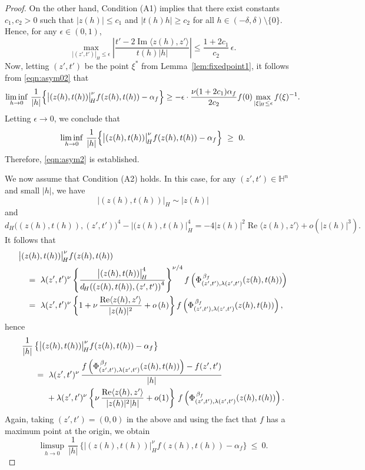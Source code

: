 \documentclass[10pt,a4paper]{amsart}
\begin{document}
\begin{proof}
On the other hand, Condition (A1) implies that there exist constants $c_1, c_2 > 0$ such that $|z(h)| \leq c_1$ and $|t(h) h| \geq c_2$ for all $h \in (-\delta, \delta) \setminus \{0\}$. Hence, for any $\epsilon \in (0, 1)$,
\[
\max_{|(z', t')|_{\! H} \leq \epsilon} \left| \frac{t' - 2 \operatorname{Im} \langle z(h), z' \rangle}{t(h) |h|} \right|
\leq \frac{1 + 2c_1}{c_2} \, \epsilon.
\]
Now, letting $(z', t')$ be the point $\xi^*$ from Lemma~\ref{lem:fixedpoint1}, it follows from \eqref{eqn:asym02} that
\begin{equation*}
\liminf_{h \to 0} \, \frac{1}{|h|} \Bigl\{ \bigl|(z(h),t(h)) \bigr|_{\! H}^{\nu} f(z(h), t(h)) - \alpha_f \Bigr\}
\geq - \epsilon \cdot \frac{\nu (1 + 2c_1) \alpha_f}{2 c_2} f(0) \max_{|\xi|_{\! H} \leq \epsilon} f(\xi)^{-1}.
\end{equation*}
Letting $\epsilon \to 0$, we conclude that
\begin{equation}
\liminf_{h \to 0} \, \frac{1}{|h|} \Bigl\{ \bigl|(z(h),t(h)) \bigr|_{\! H}^{\nu} f(z(h), t(h)) 
- \alpha_f \Bigr\} ~\geq~ 0.
\end{equation}
Therefore, \eqref{eqn:asym2} is established.

We now assume that Condition (A2) holds. In this case, for any $(z',t') \in \mathbb{H}^{n}$
and small $|h|$, we have
\[
\bigl|(z(h),t(h)) \bigr|_{\! H} \sim |z(h)|
\]
and
\[
d_{\! H}  \bigl((z(h), t(h)), (z', t')\bigr)^4 - \bigl|(z(h), t(h)\bigr|_{\! H}^4
= - 4 |z(h)|^2 \operatorname{Re} \langle z(h), z'\rangle 
+ o(|z(h)|^3).
\]
It follows that
\begin{align}
& \bigl|(z(h),t(h)) \bigr|_{\! H}^{\nu} f(z(h),t(h)) \notag\\
&\quad =~ \lambda(z',t')^{\nu} \left\{ \frac {\bigl|(z(h),t(h)) \bigr|_{\! H}^4} 
{d_{\! H} \! \left((z(h), t(h)), \left(z', t'\right)\right)^4}\right\}^{\nu/4} 
f\left(\Phi_{(z',t'),\lambda(z',t')}^{\, \beta_f} (z(h),t(h))\right) \notag\\
&\quad =~ \lambda(z',t')^{\nu} \left\{ 1+ \nu\, 
\frac {\operatorname{Re} \langle z(h), z'\rangle} {|z(h)|^2}
+ o \left( h \right) \right\} 
f\left(\Phi_{(z',t'),\lambda(z',t')}^{\, \beta_f} (z(h),t(h))\right), \notag
\end{align}
hence
\begin{align}
&\frac {1}{|h|} \, \big\{ \bigl|(z(h),t(h)) \bigr|_{\! H}^{\nu} f(z(h),t(h)) - \alpha_f \big\}\notag\\
& \quad \; ~=~ \lambda(z',t')^{\nu} \, \frac {f\left(\Phi_{(z', t'), \lambda(z',t')}^{\, \beta_f}
(z(h),t(h))\right) -f(z',t')}{|h|} \notag\\
& \qquad \quad + \lambda(z',t')^{\nu} \left\{  \nu\, 
\frac {\operatorname{Re} \langle z(h), z'\rangle} {|z(h)|^2 |h|}  + o(1) \right\} \, f\left(\Phi_{(z',t'),\lambda(z',t')}^{\, \beta_f} (z(h),t(h))\right).  \label{eqn:asym01}
\end{align}
Again, taking $(z',t')=(0,0)$ in the above and using the fact that $f$ has a maximum point at the origin, we obtain
\begin{equation}\label{eqn:limsup2}
\limsup_{h\to 0}\, \frac {1}{|h|} \, \Big\{ \bigl|(z(h),t(h))\bigr|_{\! H}^{\nu} f(z(h),t(h)) - \alpha_f \Big\} ~\leq~ 0.
\end{equation}


\end{proof}
\end{document}
